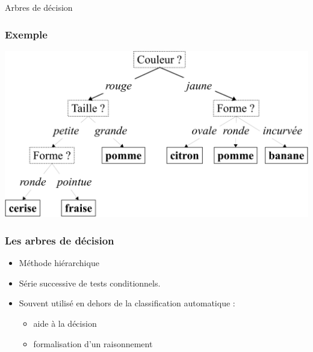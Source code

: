 \begin{frame}
  \begin{center}
    \large{Arbres de décision}
  \end{center}
\end{frame}

\begin{frame}
  \frametitle{Exemple}
  \begin{center}
    \includegraphics[width=.7\textwidth]{figures/fruit_tree}
  \end{center}
\end{frame}

\begin{frame}
  \frametitle{Les arbres de décision}
  \begin{itemize}
    \item Méthode hiérarchique
    \item Série successive de tests conditionnels.
    \item Souvent utilisé en dehors de la classification automatique : 
    \begin{itemize}
      \item aide à la décision
      \item formalisation d'un raisonnement
    \end{itemize}
  \end{itemize}
\end{frame}


